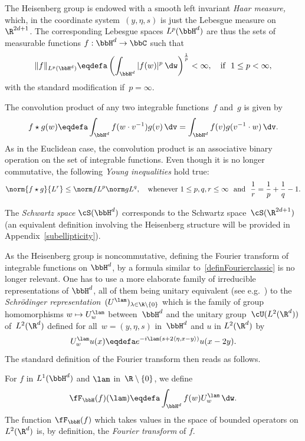 The Heisenberg group is endowed with a smooth left invariant \emph{Haar measure,} which, in the coordinate system~$(y, \eta, s)$ is just the Lebesgue measure on $\R^{2d+1}$. The corresponding Lebesgue spaces $L^p (\bbH^d)$ are thus the sets of measurable functions $f:\bbH^d\to\bbC$ such that
\[
\|f\|_{L^p (\bbH^d)} \eqdefa \left(\int_{\bbH^d} |f(w)|^p \: \dw \right)^\frac1p<\infty, \quad\hbox{if }\ 1\leq p<\infty,
\]
with the standard modification if~$p=\infty$.

The convolution product of any two integrable functions~$f$ and~$g$ is given by
\[
f \star g (w) \eqdefa \int_{\bbH^d} f (w \cdot v^{-1}) g(v)\, \dv = \int_{\bbH^d} f (v) g(v^{-1} \cdot w)\, \dv.
\]
As in the Euclidean case, the convolution product is an associative binary operation on the set of integrable functions. Even though it is no longer commutative, the following \emph{Young inequalities} hold true:
\[
\norm{ f \star g }{L^r} \leq \norm f {L^p} \norm g {L^q},
\quad \hbox{whenever}\ 1\leq p,q,r\leq\infty\ \hbox{ and }\
\frac{1}{r} = \frac{1}{p} + \frac{1}{q} - 1.
\]

The \emph{Schwartz space} $\cS(\bbH^d)$ corresponds to the Schwartz space~$\cS(\R^{2d+1})$ (an equivalent definition involving the Heisenberg structure will be provided in Appendix~\ref{subellipticity}).

As the Heisenberg group is noncommutative, defining the Fourier transform of integrable functions on $\bbH^d$, by a formula similar to~\eqref{definFourierclassic} is no longer relevant. One has to use a more elaborate family of irreducible representations of $\bbH^d$, all of them being unitary equivalent (see e.g.~\cite[Chapter~2]{taylor1}) to the \emph{Schr\"odinger representation}~$(U^\lam)_{\lambda\in\R\setminus\{0\}}$ which is the family of group homomorphisms $w\mapsto U^\lam_w$ between~$\bbH^d$ and the unitary group~$\cU(L^2(\R^d))$ of~$L^2(\R^d)$ defined for all~$w=(y,\eta, s)$ in~$\bbH^d$ and $u$ in $L^2(\R^d)$ by
\[
U^\lam _w u(x)\eqdefa e^{-i\lam (s+2\langle \eta, x-y\rangle)} u(x-2y).
\]
The standard definition of the Fourier transform then reads as follows.

\begin{defi}\label{definFourierSchrodinger}
For $f$ in $L^1(\bbH^d)$ and $\lam$ in~$ \R\setminus\{0\}$, we define
\[
\fF_{\bbH} (f)(\lam) \eqdefa \int_{\bbH^d} f(w) U^\lam_w\, \dw.
\]
The function $\fF_{\bbH} (f)$ which takes values in the space of bounded operators on $L^2(\R^d)$ is, by definition, the \emph{ Fourier transform}  of $f$.
\end{defi}

